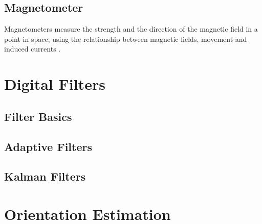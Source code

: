 \subsection{Magnetometer}

Magnetometers measure the strength and the direction of the magnetic field in a point in space, using the relationship between magnetic fields, movement and induced currents \cite{olivares_vicente_signal_2013}.


\section{Digital Filters}

\subsection{Filter Basics}

\subsection{Adaptive Filters}

\subsection{Kalman Filters}


\section{Orientation Estimation}